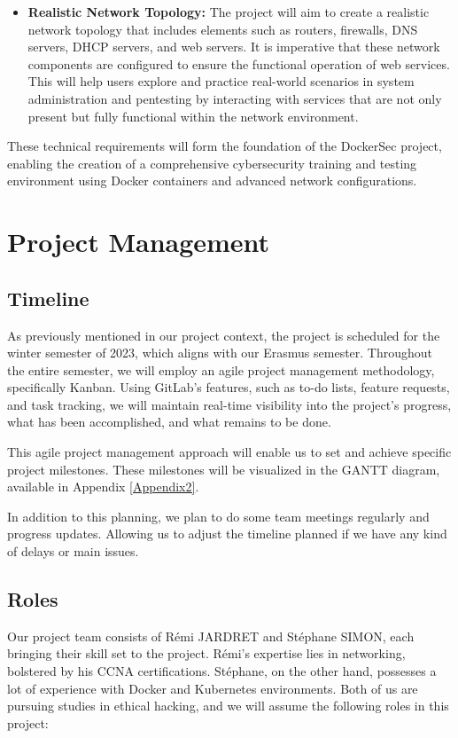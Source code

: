 \documentclass[a4paper,11pt,singlespacing]{article}
\begin{document}
\begin{itemize}
    \item \textbf{Realistic Network Topology:} The project will aim to create a realistic network topology that includes elements such as routers, firewalls, DNS servers, DHCP servers, and web servers. It is imperative that these network components are configured to ensure the functional operation of web services. This will help users explore and practice real-world scenarios in system administration and pentesting by interacting with services that are not only present but fully functional within the network environment.

 


\end{itemize}
These technical requirements will form the foundation of the DockerSec project, enabling the creation of a comprehensive cybersecurity training and testing environment using Docker containers and advanced network configurations.

\section{Project Management}
\subsection{Timeline}
As previously mentioned in our project context, the project is scheduled for the winter semester of 2023, which aligns with our Erasmus semester. Throughout the entire semester, we will employ an agile project management methodology, specifically Kanban. Using GitLab's features, such as to-do lists, feature requests, and task tracking, we will maintain real-time visibility into the project's progress, what has been accomplished, and what remains to be done.\par

This agile project management approach will enable us to set and achieve specific project milestones. These milestones will be visualized in the GANTT diagram, available in Appendix \ref{Appendix2}.\par

In addition to this planning, we plan to do some team meetings regularly and progress updates. Allowing us to adjust the timeline planned if we have any kind of delays or main issues.\par 

\subsection{Roles}
Our project team consists of Rémi JARDRET and Stéphane SIMON, each bringing their skill set to the project. Rémi's expertise lies in networking, bolstered by his CCNA certifications. Stéphane, on the other hand, possesses a lot of experience with Docker and Kubernetes environments. Both of us are pursuing studies in ethical hacking, and we will assume the following roles in this project:
\end{document}
